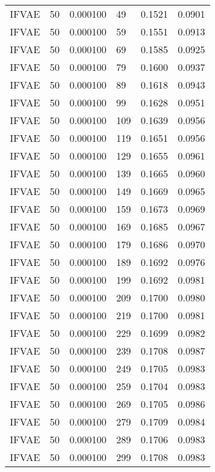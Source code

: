 \begin{tabular}{llrlrr}
   IFVAE &   50 &  0.000100 &    49 &  0.1521 &       0.0901 \\
   IFVAE &   50 &  0.000100 &    59 &  0.1551 &       0.0913 \\
   IFVAE &   50 &  0.000100 &    69 &  0.1585 &       0.0925 \\
   IFVAE &   50 &  0.000100 &    79 &  0.1600 &       0.0937 \\
   IFVAE &   50 &  0.000100 &    89 &  0.1618 &       0.0943 \\
   IFVAE &   50 &  0.000100 &    99 &  0.1628 &       0.0951 \\
   IFVAE &   50 &  0.000100 &   109 &  0.1639 &       0.0956 \\
   IFVAE &   50 &  0.000100 &   119 &  0.1651 &       0.0956 \\
   IFVAE &   50 &  0.000100 &   129 &  0.1655 &       0.0961 \\
   IFVAE &   50 &  0.000100 &   139 &  0.1665 &       0.0960 \\
   IFVAE &   50 &  0.000100 &   149 &  0.1669 &       0.0965 \\
   IFVAE &   50 &  0.000100 &   159 &  0.1673 &       0.0969 \\
   IFVAE &   50 &  0.000100 &   169 &  0.1685 &       0.0967 \\
   IFVAE &   50 &  0.000100 &   179 &  0.1686 &       0.0970 \\
   IFVAE &   50 &  0.000100 &   189 &  0.1692 &       0.0976 \\
   IFVAE &   50 &  0.000100 &   199 &  0.1692 &       0.0981 \\
   IFVAE &   50 &  0.000100 &   209 &  0.1700 &       0.0980 \\
   IFVAE &   50 &  0.000100 &   219 &  0.1700 &       0.0981 \\
   IFVAE &   50 &  0.000100 &   229 &  0.1699 &       0.0982 \\
   IFVAE &   50 &  0.000100 &   239 &  0.1708 &       0.0987 \\
   IFVAE &   50 &  0.000100 &   249 &  0.1705 &       0.0983 \\
   IFVAE &   50 &  0.000100 &   259 &  0.1704 &       0.0983 \\
   IFVAE &   50 &  0.000100 &   269 &  0.1705 &       0.0986 \\
   IFVAE &   50 &  0.000100 &   279 &  0.1709 &       0.0984 \\
   IFVAE &   50 &  0.000100 &   289 &  0.1706 &       0.0983 \\
   IFVAE &   50 &  0.000100 &   299 &  0.1708 &       0.0983 \\
\bottomrule
\end{tabular}
